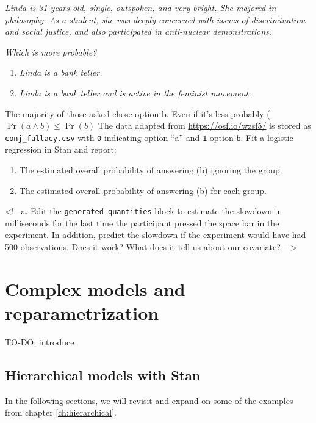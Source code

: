 \documentclass[12pt,]{krantz}
\providecommand{\tightlist}{%
  \setlength{\itemsep}{0pt}\setlength{\parskip}{0pt}}
\theoremstyle{definition}
\theoremstyle{definition}
\theoremstyle{definition}
\theoremstyle{remark}
\begin{document}
\emph{Linda is 31 years old, single, outspoken, and very bright. She majored in philosophy. As a student, she was deeply concerned with issues of discrimination and social justice, and also participated in anti-nuclear demonstrations.}

\emph{Which is more probable?}

\begin{enumerate}
\def\labelenumi{\alph{enumi}.}
\tightlist
\item
  \emph{Linda is a bank teller.}
\item
  \emph{Linda is a bank teller and is active in the feminist movement.}
\end{enumerate}

The majority of those asked chose option b. Even if it's less probably (\(\Pr(a\land b)\leq \Pr(b)\) The data adapted from \url{https://osf.io/wzsf5/} is stored as \texttt{conj\_fallacy.csv} with \texttt{0} indicating option ``a'' and \texttt{1} option \texttt{b}.
Fit a logistic regression in Stan and report:

\begin{enumerate}
\def\labelenumi{\alph{enumi}.}
\tightlist
\item
  The estimated overall probability of answering (b) ignoring the group.
\item
  The estimated overall probability of answering (b) for each group.
\end{enumerate}

\textless{}!-- a. Edit the \texttt{generated\ quantities} block to estimate the slowdown in milliseconds for the last time the participant pressed the space bar in the experiment. In addition, predict the slowdown if the experiment would have had 500 observations. Does it work? What does it tell us about our covariate? --
\textgreater{}

\hypertarget{ch:complexstan}{%
\chapter{Complex models and reparametrization}\label{ch:complexstan}}

TO-DO: introduce

\hypertarget{hierarchical-models-with-stan}{%
\section{Hierarchical models with Stan}\label{hierarchical-models-with-stan}}

In the following sections, we will revisit and expand on some of the examples from chapter \ref{ch:hierarchical}.
\end{document}
